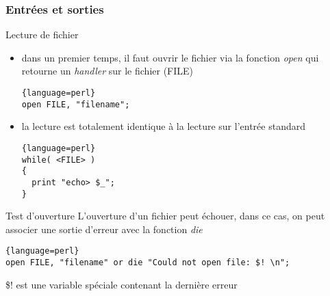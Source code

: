 \begin{frame}[fragile]
  \frametitle{Entrées et sorties}

  \begin{exampleblock}{Lecture de fichier}
    \begin{itemize}
    \item dans un premier temps, il faut ouvrir le fichier via la fonction
      \textit{open} qui retourne un \textit{handler} sur le fichier (FILE)
      \begin{lstlisting}{language=perl}
open FILE, "filename";
      \end{lstlisting}
    \item la lecture est totalement identique à la lecture sur l'entrée
      standard
      \begin{lstlisting}{language=perl}
while( <FILE> )
{
  print "echo> $_";
}
      \end{lstlisting}
    \end{itemize}
  \end{exampleblock}

  \begin{alertblock}{Test d'ouverture}
    L'ouverture d'un fichier peut échouer, dans ce cas, on peut associer une
    sortie d'erreur avec la fonction \textit{die}
    \begin{lstlisting}{language=perl}
open FILE, "filename" or die "Could not open file: $! \n";
    \end{lstlisting}
    \$! est une variable spéciale contenant la dernière erreur
  \end{alertblock}

\end{frame}

